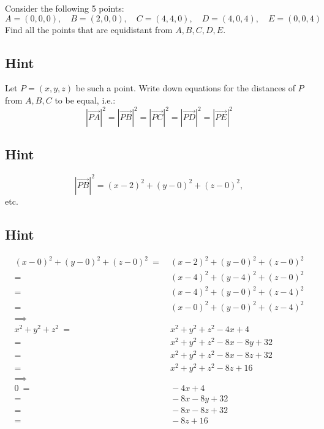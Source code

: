 \documentclass[a4paper,10pt]{article}
\begin{document}
Consider the following 5 points:
\[
    A = (0, 0, 0), \quad B = (2, 0, 0), \quad C = (4, 4, 0), \quad D = (4, 0, 4), \quad E = (0, 0, 4)
\]
Find all the points that are equidistant from $A,B,C,D,E$.

\subsection{Hint}
Let $P=(x,y,z)$ be such a point. Write down equations for the distances of $P$ from $A,B,C$ to be equal, i.e.:
\[
    \left|\overrightarrow{PA}\right|^2 = \left|\overrightarrow{PB}\right|^2 = \left|\overrightarrow{PC}\right|^2 = \left|\overrightarrow{PD}\right|^2 = \left|\overrightarrow{PE}\right|^2
\]

\subsection{Hint}
\[
    \left|\overrightarrow{PB}\right|^2 = (x-2)^2 + (y-0)^2 +(z-0)^2,
\]
etc.

\subsection{Hint}
\begin{align*}
    (x-0)^2 + (y-0)^2 + (z-0)^2\  = & \ (x-2)^2 + (y-0)^2 + (z-0)^2    \\
    =                               & \ (x-4)^2 + (y-4)^2 + (z-0)^2    \\
    =                               & \ (x-4)^2 + (y-0)^2 + (z-4)^2    \\
    =                               & \ (x-0)^2 + (y-0)^2 + (z-4)^2    \\
    \implies                        &                                  \\
    x^2 + y^2 + z^2\  =             & \ x^2 + y^2 + z^2 - 4x + 4       \\
    =                               & \ x^2 + y^2 + z^2 - 8x - 8y + 32 \\
    =                               & \ x^2 + y^2 + z^2 - 8x - 8z + 32 \\
    =                               & \ x^2 + y^2 + z^2 - 8z + 16      \\
    \implies                        &                                  \\
    0\ =                            & \ - 4x + 4                       \\
    =                               & \ - 8x - 8y + 32                 \\
    =                               & \ - 8x - 8z + 32                 \\
    =                               & \ - 8z + 16                      \\
\end{align*}
\end{document}
